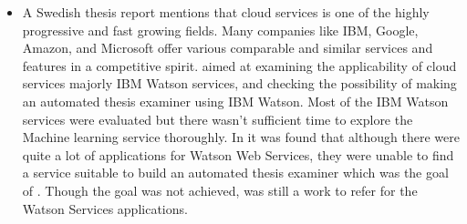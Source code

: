 \begin{itemize}
    \item A Swedish thesis report \cite{eriksson2018granskning} mentions that cloud services is one of the highly progressive and fast growing fields. Many companies like \acs{IBM}, Google, Amazon, and Microsoft offer various comparable and similar services and features in a competitive spirit. \cite{eriksson2018granskning} aimed at examining the applicability of cloud services majorly \acs{IBM} Watson services, and checking the possibility of making an automated thesis examiner using \acs{IBM} Watson. Most of the \acs{IBM} Watson services were evaluated but there wasn't sufficient time to explore the Machine learning service thoroughly. In \cite{eriksson2018granskning} it was found that although there were quite a lot of applications for Watson Web Services, they were unable to find a service suitable to build an automated thesis examiner which was the goal of \cite{eriksson2018granskning}. Though the goal was not achieved, \cite{eriksson2018granskning} was still a work to refer for the Watson Services applications.


\end{itemize}
